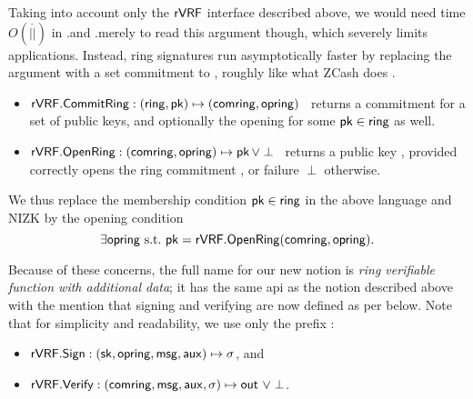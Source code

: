 
Taking into account only the ${\mathsf{rVRF}}$ interface described above, we would need time $O(|\ring|)$ in \rVRF.\rSign and \rVRF.\rVerify merely to read
this \ring argument though, which severely limits applications.  Instead,
ring signatures run asymptotically faster by replacing the \ring argument
with a set commitment to \ring, roughly like what ZCash does \cite{zcash_protocol}.
\begin{itemize}
\item ${\mathsf{rVRF}}.{\mathsf{CommitRing}} : (\mathsf{ring},\mathsf{pk}) \mapsto (\mathsf{comring},\mathsf{opring})$ \,
    returns a commitment for a set \ring of public keys, and
    optionally the opening \openring for some $\mathsf{pk} \in \mathsf{ring}$ as well.
\item ${\mathsf{rVRF}}.{\mathsf{OpenRing}} : (\mathsf{comring},\mathsf{opring}) \mapsto \mathsf{pk} \, \lor \perp$ \,
    returns a public key \pk, provided \openring correctly opens
    the ring commitment \comring, or failure $\perp$ otherwise.
\end{itemize}

We thus replace the membership condition $\mathsf{pk} \in \mathsf{ring}$ in the above
language and NIZK by the opening condition
$$ \exists \mathsf{opring} \textrm{\ s.t.\ } \mathsf{pk} = {\mathsf{rVRF}}.{\mathsf{OpenRing}}(\mathsf{comring},\mathsf{opring}) . $$
%


Because of these concerns, the full name for our new notion is \emph{ring verifiable function with additional data}; 
it has the same api as the \rVRF notion described above with the mention that signing and verifying are now defined as per below. Note that for simplicity and readability,
we use only the prefix \rVRF:
\begin{itemize}
\item ${\mathsf{rVRF}}.{\mathsf{Sign}} : (\mathsf{sk},\mathsf{opring},\mathsf{msg},\mathsf{aux}) \mapsto \sigma$, \quad and
\item ${\mathsf{rVRF}}.{\mathsf{Verify}} : (\mathsf{comring},\mathsf{msg},\mathsf{aux},\sigma) \mapsto {\ensuremath{\mathsf{out}}} \,\, \lor \perp$.
\end{itemize}

